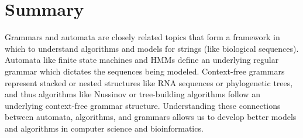 \documentclass[12pt]{article}
\begin{document}
\section{Summary}
Grammars and automata are closely related topics that form a framework in which to understand algorithms and models for strings (like biological sequences). Automata like finite state machines and HMMs define an underlying regular grammar which dictates the sequences being modeled. Context-free grammars represent stacked or nested structures like RNA sequences or phylogenetic trees, and thus algorithms like Nussinov or tree-building algorithms follow an underlying context-free grammar structure. Understanding these connections between automata, algorithms, and grammars allows us to develop better models and algorithms in computer science and bioinformatics.
\end{document}
